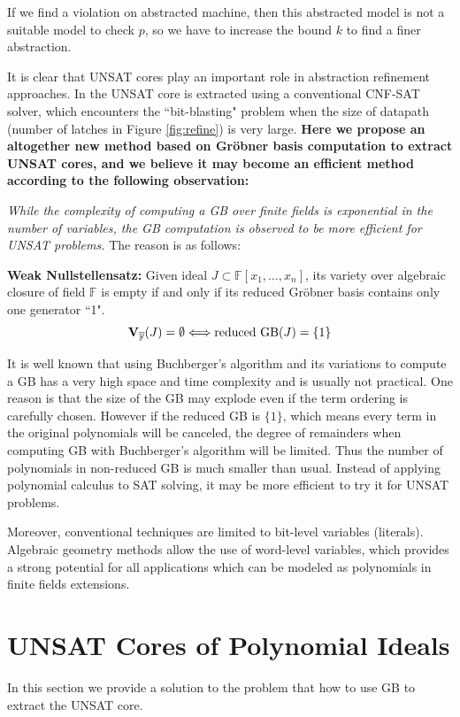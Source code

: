 If we find a violation on abstracted machine, then this
abstracted model is not a suitable model to check $p$, so we have to increase the bound $k$ to find a finer abstraction.

It is clear that UNSAT cores play an important role in abstraction refinement approaches. In \cite{zhang2005design}
the UNSAT core is extracted using a conventional CNF-SAT solver, which encounters the ``bit-blasting" problem
when the size of datapath (number of latches in Figure \ref{fig:refine}) is very large. \textbf{Here we propose an altogether new 
method based on Gr\"obner basis computation to extract UNSAT cores, and we believe it may become an efficient 
method according to the following observation:}

{\it While the complexity of computing a GB over finite fields is exponential in the number of variables,
the GB  computation is observed to be more efficient for UNSAT problems.} 
The reason is as follows:
\begin{Theorem}
{\bf Weak Nullstellensatz:} Given ideal $J\subset \mathbb F[x_1,\dots,x_n]$, its variety over algebraic closure
of field $\mathbb F$ is empty if and only if its reduced Gr\"obner basis contains only one generator ``1".
$${\bf V}_{\overline{\mathbb F}}(J) = \emptyset \Longleftrightarrow \text{reduced GB}(J) = \{1\}$$
\end{Theorem}
It is well known that using Buchberger's algorithm and its variations to compute a GB has a very high space and
time complexity and is usually not practical. One reason is that the size of the GB may explode even if the term
ordering is carefully chosen. However if the reduced GB is $\{1\}$, which means every term in the original polynomials
will be canceled, the degree of remainders when computing GB with Buchberger's algorithm will be limited. 
Thus the number of polynomials in non-reduced GB is much smaller than usual.
Instead of applying polynomial calculus to SAT solving, it may be more efficient to try it for UNSAT
problems.

Moreover, conventional techniques are limited to bit-level variables (literals). Algebraic geometry methods
allow the use of word-level variables, which provides a strong potential for all applications which can be
modeled as polynomials in finite fields extensions.

\section{UNSAT Cores of Polynomial Ideals}
\label{sec:core}
In this section we provide a solution to the problem that how to use 
GB to extract the UNSAT core. 

